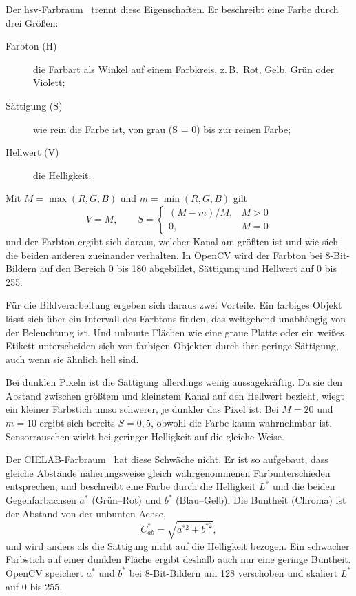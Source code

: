 Der \ac{hsv}-Farbraum~\cite{smith1978} trennt diese Eigenschaften. Er beschreibt eine Farbe
durch drei Größen:
\begin{description}
  \item[Farbton (H)] die Farbart als Winkel auf einem Farbkreis, z.\,B.\ Rot, Gelb, Grün oder
    Violett;
  \item[Sättigung (S)] wie rein die Farbe ist, von grau (S = 0) bis zur reinen Farbe;
  \item[Hellwert (V)] die Helligkeit.
\end{description}
Mit $M = \max(R, G, B)$ und $m = \min(R, G, B)$ gilt
\begin{equation}
  V = M, \qquad S = \begin{cases} (M - m)/M, & M > 0 \\ 0, & M = 0 \end{cases}
\end{equation}
und der Farbton ergibt sich daraus, welcher Kanal am größten ist und wie sich die beiden
anderen zueinander verhalten. In OpenCV wird der Farbton bei 8-Bit-Bildern auf den Bereich 0
bis 180 abgebildet, Sättigung und Hellwert auf 0 bis 255.

Für die Bildverarbeitung ergeben sich daraus zwei Vorteile. Ein farbiges Objekt lässt sich
über ein Intervall des Farbtons finden, das weitgehend unabhängig von der Beleuchtung ist.
Und unbunte Flächen wie eine graue Platte oder ein weißes Etikett unterscheiden sich von
farbigen Objekten durch ihre geringe Sättigung, auch wenn sie ähnlich hell sind.

Bei dunklen Pixeln ist die Sättigung allerdings wenig aussagekräftig. Da sie den Abstand
zwischen größtem und kleinstem Kanal auf den Hellwert bezieht, wiegt ein kleiner Farbstich
umso schwerer, je dunkler das Pixel ist: Bei $M = 20$ und $m = 10$ ergibt sich bereits
$S = 0{,}5$, obwohl die Farbe kaum wahrnehmbar ist. Sensorrauschen wirkt bei geringer
Helligkeit auf die gleiche Weise.

Der CIELAB-Farbraum~\cite{fairchild2013} hat diese Schwäche nicht. Er ist so aufgebaut, dass
gleiche Abstände näherungsweise gleich wahrgenommenen Farbunterschieden entsprechen, und
beschreibt eine Farbe durch die Helligkeit $L^*$ und die beiden Gegenfarbachsen $a^*$
(Grün--Rot) und $b^*$ (Blau--Gelb). Die Buntheit (Chroma) ist der Abstand von der unbunten
Achse,
\begin{equation}
  C^*_{ab} = \sqrt{a^{*2} + b^{*2}} ,
  \label{eq:chroma}
\end{equation}
und wird anders als die Sättigung nicht auf die Helligkeit bezogen. Ein schwacher Farbstich
auf einer dunklen Fläche ergibt deshalb auch nur eine geringe Buntheit. OpenCV speichert
$a^*$ und $b^*$ bei 8-Bit-Bildern um 128 verschoben und skaliert $L^*$ auf 0 bis 255.

